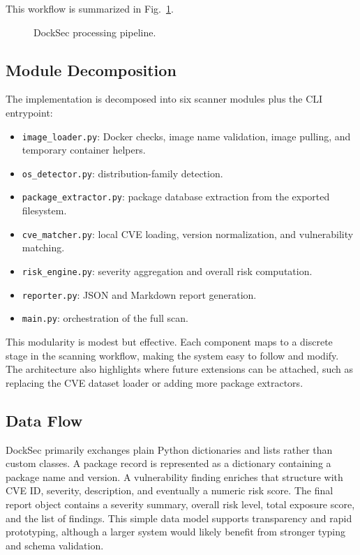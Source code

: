 \documentclass[12pt,draftclsnofoot,onecolumn]{IEEEtran}
\begin{document}
This workflow is summarized in Fig.~\ref{fig:pipeline}.

\begin{figure}[!t]
\centering
{}
\caption{DockSec processing pipeline.}
\label{fig:pipeline}
\end{figure}

\subsection{Module Decomposition}
The implementation is decomposed into six scanner modules plus the CLI entrypoint:
\begin{itemize}
  \item \texttt{image\_loader.py}: Docker checks, image name validation, image pulling, and temporary container helpers.
  \item \texttt{os\_detector.py}: distribution-family detection.
  \item \texttt{package\_extractor.py}: package database extraction from the exported filesystem.
  \item \texttt{cve\_matcher.py}: local CVE loading, version normalization, and vulnerability matching.
  \item \texttt{risk\_engine.py}: severity aggregation and overall risk computation.
  \item \texttt{reporter.py}: JSON and Markdown report generation.
  \item \texttt{main.py}: orchestration of the full scan.
\end{itemize}

This modularity is modest but effective. Each component maps to a discrete stage in the scanning workflow, making the system easy to follow and modify. The architecture also highlights where future extensions can be attached, such as replacing the CVE dataset loader or adding more package extractors.

\subsection{Data Flow}
DockSec primarily exchanges plain Python dictionaries and lists rather than custom classes. A package record is represented as a dictionary containing a package name and version. A vulnerability finding enriches that structure with CVE ID, severity, description, and eventually a numeric risk score. The final report object contains a severity summary, overall risk level, total exposure score, and the list of findings. This simple data model supports transparency and rapid prototyping, although a larger system would likely benefit from stronger typing and schema validation.
\end{document}
